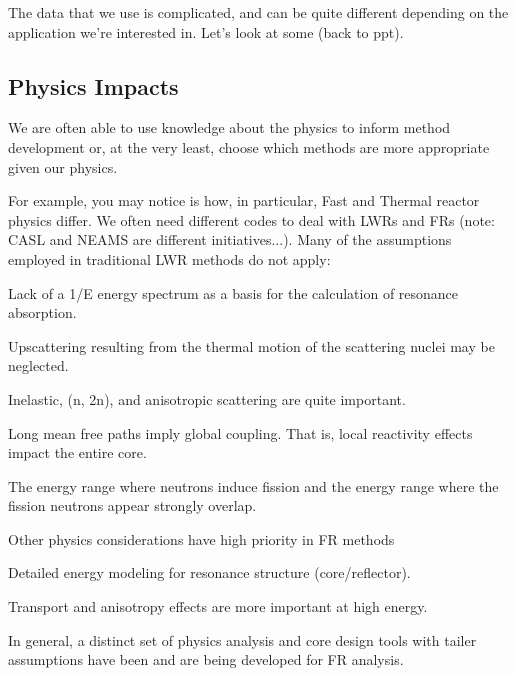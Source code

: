 \documentclass[12pt]{article}
\begin{document}
The data that we use is complicated, and can be quite different depending on the application we're interested in. Let's look at some (back to ppt).

\subsection*{Physics Impacts}
We are often able to use knowledge about the physics to inform method development or, at the very least, choose which methods are more appropriate given our physics. 

For example, you may notice is how, in particular, Fast and Thermal reactor physics differ. We often need different codes to deal with LWRs and FRs (note: CASL and NEAMS are different initiatives...). 
%
Many of the assumptions employed in traditional LWR methods do not apply:
\begin{compactitem}
\item Lack of a 1/E energy spectrum as a basis for the calculation of resonance absorption.
\item Upscattering resulting from the thermal motion of the scattering nuclei may be neglected.
\item Inelastic, (n, 2n), and anisotropic scattering are quite important.
\item Long mean free paths imply global coupling. That is, local reactivity effects impact the entire core.  
\item The energy range where neutrons induce fission and the energy range where the fission neutrons appear strongly overlap.
\end{compactitem}
%
Other physics considerations have high priority in FR methods
\begin{compactitem}
\item Detailed energy modeling for resonance structure (core/reflector).
\item Transport and anisotropy effects are more important at high energy.
\end{compactitem}
%
In general, a distinct set of physics analysis and core design tools with tailer assumptions have been and are being developed for FR analysis.
\end{document}
